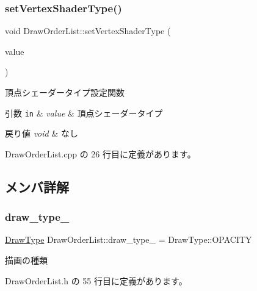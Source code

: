 \subsubsection{\texorpdfstring{set\+Vertex\+Shader\+Type()}{setVertexShaderType()}}
{\footnotesize\ttfamily void Draw\+Order\+List\+::set\+Vertex\+Shader\+Type (\begin{DoxyParamCaption}\item[{\mbox{\hyperlink{class_shader_manager_a9b51e49d70eb3cc58f6d1f3994e8cfbd}{Shader\+Manager\+::\+Vertex\+Shader\+Type}}}]{value }\end{DoxyParamCaption})}



頂点シェーダータイプ設定関数 


\begin{DoxyParams}[1]{引数}
\mbox{\tt in}  & {\em value} & 頂点シェーダータイプ \\
\hline
\end{DoxyParams}

\begin{DoxyRetVals}{戻り値}
{\em void} & なし \\
\hline
\end{DoxyRetVals}


 Draw\+Order\+List.\+cpp の 26 行目に定義があります。



\subsection{メンバ詳解}
\mbox{\label{class_draw_order_list_ad2ce43c1b177ba4dae4198aa272eeb23}} 
\subsubsection{\texorpdfstring{draw\+\_\+type\+\_\+}{draw\_type\_}}
{\footnotesize\ttfamily \mbox{\hyperlink{class_draw_order_list_a6c9b9ceb312c16d399ef355f4f3486bb}{Draw\+Type}} Draw\+Order\+List\+::draw\+\_\+type\+\_\+ = Draw\+Type\+::\+O\+P\+A\+C\+I\+TY\hspace{0.3cm}{\ttfamily [private]}}



描画の種類 



 Draw\+Order\+List.\+h の 55 行目に定義があります。

